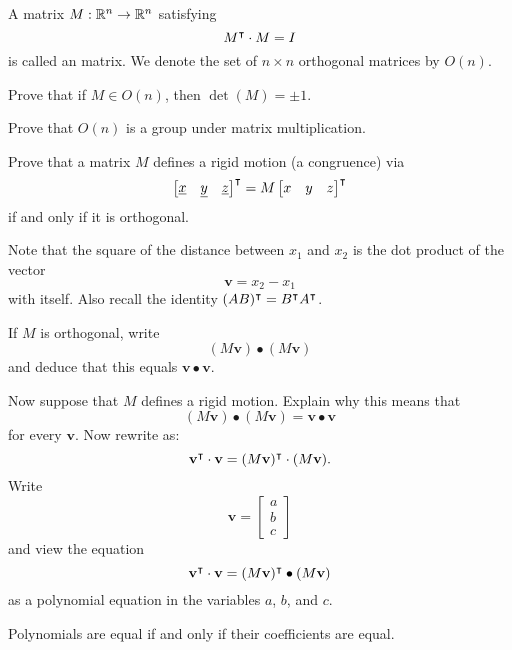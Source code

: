 \documentclass{ximera}
\begin{document}
\begin{definition}
  A matrix $M:\mathbb R^n\to \mathbb R^n$ satisfying
  \[
  M^\intercal \cdot M=I
  \]
  is called an  matrix. We denote the set of $n\times
  n$ orthogonal matrices by $O(n)$.
\end{definition}


\begin{exercise}
  Prove that if $M\in O(n)$, then $\det(M) = \pm 1$.
\end{exercise}


\begin{exercise}
  Prove that $O(n)$ is a group under matrix multiplication.
\end{exercise}




\begin{exercise}
  Prove that a matrix $ M$ defines a rigid motion (a congruence)
  via
  \[
  \begin{bmatrix}
    \underline{x} & \underline{y} & \underline{z}%
  \end{bmatrix}^\transpose
  = M \begin{bmatrix} x & y & z\end{bmatrix}^\transpose
  \]
  if and only if it is orthogonal.

  \begin{hint}
    Note that the square of the distance between $x_{1}$ and
    $x_{2}$ is the dot product of the vector%
    \[
    {\mathbf v}=x_{2}-x_{1}%
    \]
    with itself.  Also recall the identity $(AB)^\intercal=B^\intercal A^\intercal$.
  \end{hint}
  \begin{hint}
    If $ M$ is orthogonal, write
    \[
    ( M{\mathbf v}) \bullet ( M{\mathbf v})
    \]
    and deduce that this equals ${\mathbf v}\bullet{\mathbf v}$. 
  \end{hint}
  \begin{hint}
    Now suppose that $ M$ defines a rigid motion. Explain why this means
    that
    \[
    ( M{\mathbf v}) \bullet ( M{\mathbf v})=
    {\mathbf v} \bullet {\mathbf v}
    \]
    for every ${\mathbf v}$.  Now rewrite as:
    \[
    {\mathbf v}^\intercal \cdot{\mathbf v}
    =( M{\mathbf v})^\intercal \cdot ( M{\mathbf v}).
    \]
    Write
    \[
    {\mathbf v} =
    \begin{bmatrix}
      a \\ b \\ c
    \end{bmatrix}
    \]
     and view the equation 
    \[
    {\mathbf v}^\intercal \cdot{\mathbf v}
    =( M{\mathbf v})^\intercal \bullet ( M{\mathbf v})
    \]
    as a polynomial equation in the variables $a$, $b$, and $c$. 
  \end{hint}
  \begin{hint}
    Polynomials are equal if and only if their coefficients are equal. 
  \end{hint}
\end{exercise}
\end{document}
